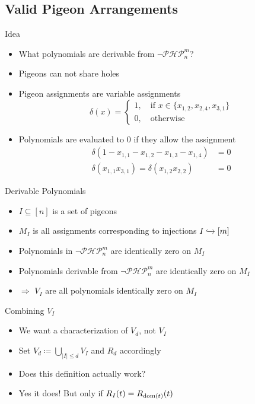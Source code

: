 \documentclass[xcolor={dvipsnames}]{beamer}
\newcommand{\PHP}{\ensuremath{\neg \mathcal{PHP}^m_n}\xspace}
\begin{document}
\subsection{Valid Pigeon Arrangements}
\begin{frame}{Idea}
    \begin{itemize}[<+->]
        \item What polynomials are derivable from \PHP?
        \item Pigeons can not share holes
        \item Pigeon assignments are variable assignments
            $$\delta(x) = \begin{cases}
                1, \quad \text{if } x \in \{x_{1, 2}, x_{2, 4}, x_{3, 1}\}\\
                0, \quad \text{otherwise}
            \end{cases}$$
        \item Polynomials are evaluated to $0$ if they allow the assignment
            \begin{align*}
                \delta(1 - x_{1, 1} - x_{1, 2} - x_{1, 3} - x_{1, 4}) &= 0\\
                \delta(x_{1, 1} x_{3, 1}) = \delta(x_{1, 2} x_{2, 2}) &= 0
            \end{align*}
    \end{itemize}
\end{frame}

\begin{frame}{Derivable Polynomials}
    \begin{itemize}[<+->]
        \item $I \subseteq [n]$ is a set of pigeons
        \item $M_I$ is all assignments corresponding to injections $I \xhookrightarrow{} [m]$
        \item Polynomials in \PHP are identically zero on $M_I$
        \item Polynomials derivable from \PHP are identically zero on $M_I$
        \item[] $\Rightarrow$ $V_I$ are all polynomials identically zero on $M_I$
    \end{itemize}
\end{frame}

\begin{frame}{Combining $V_I$}
    \begin{itemize}[<+->]
        \item We want a characterization of $V_d$, not $V_I$
        \item Set $V_d \coloneqq \bigcup_{|I| \leq d} V_I$ and $R_d$ accordingly
        \item Does this definition actually work?
        \item Yes it does! But only if $R_I(t) = R_{\operatorname{dom}(t)}(t)$
    \end{itemize}
\end{frame}
\end{document}
